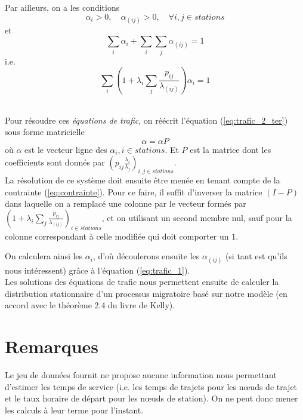 \documentclass[12pt,a4paper]{article}
\begin{document}
Par ailleurs, on a les conditions
\[
\alpha_i > 0, \quad \alpha_{(ij)} >0, \quad \forall i,j \in stations 
\]
et
\begin{equation}
\sum_i \alpha_i + \sum_i \sum_j \alpha_{(ij)} = 1
\end{equation}
i.e.
\begin{equation}
\sum_i \left(1 + \lambda_i \sum_j \frac{p_{ij}}{\lambda_{(ij)}} \right) \alpha_i = 1
\label{eq:contrainte}
\end{equation}

~\\
Pour résoudre ces \textit{équations de trafic}, on réécrit l'équation (\ref{eq:trafic_2_ter}) sous forme matricielle
\begin{equation}
\alpha = \alpha P
\end{equation}
où $\alpha$ est le vecteur ligne des $\alpha_i, i \in stations$. Et $P$ est la matrice dont les coefficients sont donnés par $\left( p_{ij} \frac{\lambda_i}{\lambda_j} \right)_{i,j \in stations}$.\\

La résolution de ce système doit ensuite être menée en tenant compte de la contrainte (\ref{eq:contrainte}). Pour ce faire, il suffit d'inverser la matrice $(I-P)$ dans laquelle on a remplacé une colonne par le vecteur formés par $\left(1 + \lambda_i \sum_j \frac{p_{ij}}{\lambda_{(ij)}} \right)_{i \in stations}$, et on utilisant un second membre nul, sauf pour la colonne correspondant à celle modifiée qui doit comporter un $1$.
 
On calculera ainsi les $\alpha_i$, d'où découlerons ensuite les $\alpha_{(ij)}$ (si tant est qu'ils nous intéressent) grâce à l'équation (\ref{eq:trafic_1}).\\

Les solutions des équations de trafic nous permettent ensuite de calculer la distribution stationnaire d'un processus migratoire basé sur notre modèle (en accord avec le théorème 2.4 du livre de Kelly).



\section{Remarques}

Le jeu de données fournit ne propose aucune information nous permettant d'estimer les temps de service (i.e. les temps de trajets pour les nœuds de trajet et le taux horaire de départ pour les nœuds de station). On ne peut donc mener les calculs à leur terme pour l'instant.

%
%
\end{document}

